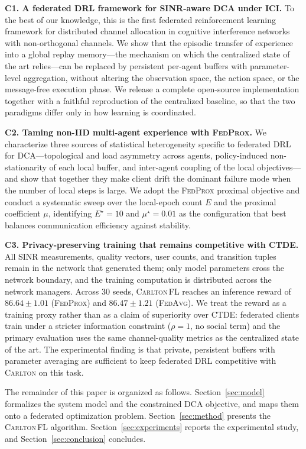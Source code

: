 \documentclass[journal]{IEEEtran}
\newcommand{\CARLTON}{\textsc{Carlton}}
\newcommand{\OURS}{\textsc{Carlton\,FL}}
\newcommand{\FedAvg}{\textsc{FedAvg}}
\newcommand{\FedProx}{\textsc{FedProx}}
\begin{document}
\textbf{C1. A federated DRL framework for SINR-aware DCA under ICI.} To the
best of our knowledge, this is the first federated reinforcement learning
framework for distributed channel allocation in cognitive interference networks
with non-orthogonal channels. We show that the episodic transfer of experience
into a global replay memory---the mechanism on which the centralized state of
the art relies---can be replaced by persistent per-agent buffers with
parameter-level aggregation, without altering the observation space, the action
space, or the message-free execution phase. We release a complete open-source
implementation together with a faithful reproduction of the centralized
baseline, so that the two paradigms differ only in how learning is coordinated.

\textbf{C2. Taming non-IID multi-agent experience with \FedProx{}.} We
characterize three sources of statistical heterogeneity specific to federated
DRL for DCA---topological and load asymmetry across agents, policy-induced
non-stationarity of each local buffer, and inter-agent coupling of the local
objectives---and show that together they make client drift the dominant failure
mode when the number of local steps is large. We adopt the \FedProx{} proximal
objective and conduct a systematic sweep over the local-epoch count $E$ and the
proximal coefficient $\mu$, identifying $E^{\star}=10$ and $\mu^{\star}=0.01$
as the configuration that best balances communication efficiency against
stability.

\textbf{C3. Privacy-preserving training that remains competitive with CTDE.}
All SINR measurements, quality vectors, user counts, and transition tuples
remain in the network that generated them; only model parameters cross the
network boundary, and the training computation is distributed across the
network managers. Across $30$ seeds, \OURS{} reaches an inference reward of
$86.64\pm 1.01$ (\FedProx{}) and $86.47\pm 1.21$ (\FedAvg{}). We treat the
reward as a training proxy rather than as a claim of superiority over CTDE:
federated clients train under a stricter information constraint ($\rho=1$, no
social term) and the primary evaluation uses the same channel-quality metrics
as the centralized state of the art. The experimental finding is that private,
persistent buffers with parameter averaging are sufficient to keep federated
DRL competitive with \CARLTON{} on this task.

The remainder of this paper is organized as follows.
Section~\ref{sec:model} formalizes the system model and the constrained DCA
objective, and maps them onto a federated optimization problem.
Section~\ref{sec:method} presents the \OURS{} algorithm.
Section~\ref{sec:experiments} reports the experimental study, and
Section~\ref{sec:conclusion} concludes.
\end{document}

